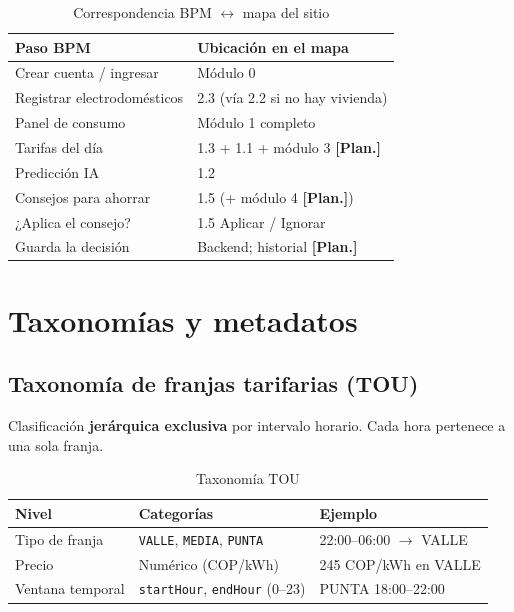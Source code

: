 \documentclass[11pt,a4paper]{article}
\newcommand{\stplan}{\textcolor{plan}{\textbf{[Plan.]}}}
\begin{document}
\begin{table}[H]
\centering
\small
\begin{tabularx}{\textwidth}{@{}L{4.2cm}L{4.2cm}@{}}
\toprule
\textbf{Paso BPM} & \textbf{Ubicación en el mapa} \\
\midrule
Crear cuenta / ingresar & Módulo 0 \\
Registrar electrodomésticos & 2.3 (vía 2.2 si no hay vivienda) \\
Panel de consumo & Módulo 1 completo \\
Tarifas del día & 1.3 + 1.1 + módulo 3 \stplan \\
Predicción IA & 1.2 \\
Consejos para ahorrar & 1.5 (+ módulo 4 \stplan) \\
¿Aplica el consejo? & 1.5 Aplicar / Ignorar \\
Guarda la decisión & Backend; historial \stplan \\
\bottomrule
\end{tabularx}
\caption{Correspondencia BPM $\leftrightarrow$ mapa del sitio}
\end{table}

\section{Taxonomías y metadatos}

\subsection{Taxonomía de franjas tarifarias (TOU)}

Clasificación \textbf{jerárquica exclusiva} por intervalo horario. Cada hora pertenece a una sola franja.

\begin{table}[H]
\centering
\small
\begin{tabular}{@{}L{3.2cm}L{4.5cm}L{5.5cm}@{}}
\toprule
\textbf{Nivel} & \textbf{Categorías} & \textbf{Ejemplo} \\
\midrule
Tipo de franja & \texttt{VALLE}, \texttt{MEDIA}, \texttt{PUNTA} & 22:00--06:00 $\rightarrow$ VALLE \\
Precio & Numérico (COP/kWh) & 245 COP/kWh en VALLE \\
Ventana temporal & \texttt{startHour}, \texttt{endHour} (0--23) & PUNTA 18:00--22:00 \\
\bottomrule
\end{tabular}
\caption{Taxonomía TOU}
\end{table}
\end{document}
